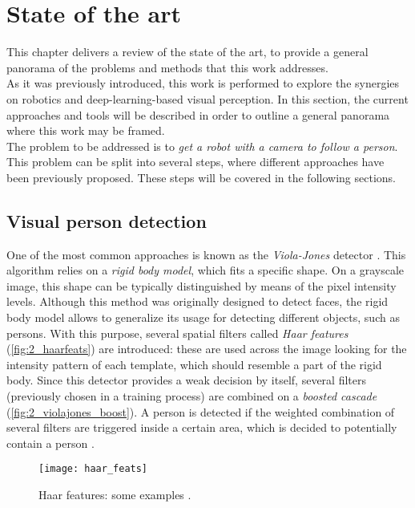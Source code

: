 \chapter{State of the art}
\label{chap:2_sota}

This chapter delivers a review of the state of the art, to provide a general panorama of the problems and methods that this work addresses.\\

As it was previously introduced, this work is performed to explore the synergies on robotics and deep-learning-based visual perception. In this section, the current approaches and tools will be described in order to outline a general panorama where this work may be framed.\\

The problem to be addressed is to \textit{get a robot with a camera to follow a person}. This problem can be split into several steps, where different approaches have been previously proposed. These steps will be covered in the following sections.
	
\section{Visual person detection}
\label{sec:2_detection}
One of the most common approaches is known as the \textit{Viola-Jones} detector \cite{violajones}. This algorithm relies on a \textit{rigid body model}, which fits a specific shape. On a grayscale image, this shape can be typically distinguished by means of the pixel intensity levels. Although this method was originally designed to detect faces, the rigid body model allows to generalize its usage for detecting different objects, such as persons. With this purpose, several spatial filters called \textit{Haar features} (\autoref{fig:2_haarfeats}) are introduced: these are used across the image looking for the intensity pattern of each template, which should resemble a part of the rigid body. Since this detector provides a weak decision by itself, several filters (previously chosen in a training process) are combined on a \textit{boosted cascade} (\autoref{fig:2_violajones_boost}). A person is detected if the weighted combination of several filters are triggered inside a certain area, which is decided to potentially contain a person \cite{diapos_cv_clasif}.

\begin{figure}[h]
	\centering
	\texttt{[image: haar\_feats]}
	\caption{Haar features: some examples \cite{diapos_cv_clasif}.}
	\label{fig:2_haarfeats}
\end{figure}

